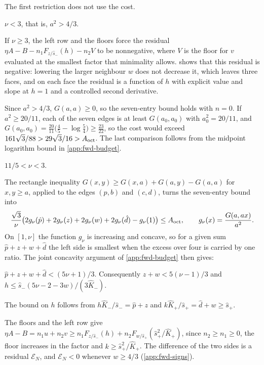  The first restriction does not use the cost.

\begin{lemma}\label{lem:fwd-small}
$\nu<3$, that is, $a^2>4/3$.
\end{lemma}

If $\nu\ge3$, the left row and the floors force the residual
$\eta A-B-n_1F_{z/\hat s_-}(h)-n_2V$ to be nonnegative, where $V$ is the floor for $v$ evaluated at
the smallest factor that minimality allows.  shows that this residual is
negative: lowering the larger neighbour $w$ does not decrease it, which leaves three faces, and on
each face the residual is a function of $h$ with explicit value and slope at $h=1$ and a controlled
second derivative.

 Since $a^2>4/3$, $G(a,a)\ge0$, so the
seven-entry bound holds with $n=0$. If $a^2\ge20/11$, each of the seven edges is at least
$G(a_0,a_0)$ with $a_0^2=20/11$, and $G(a_0,a_0)=\frac{20}{11}\bigl(\frac45-\log\frac54\bigr)\ge
\frac{23}{22}$, so the cost would exceed $161\sqrt3/88>29\sqrt3/16>A_{\mathrm{oct}}$.
The last comparison follows from the midpoint logarithm bound in \cref{app:fwd-budget}.

\begin{lemma}\label{lem:fwd-threshold}
$11/5<\nu<3$.
\end{lemma}

 The rectangle inequality
$G(x,y)\ge G(x,a)+G(a,y)-G(a,a)$ for $x,y\ge a$, applied to the edges $(p,b)$ and $(c,d)$, turns
the seven-entry bound into
\[
\frac{\sqrt3}{\nu}\bigl(2g_\nu(\hat p)+2g_\nu(z)+2g_\nu(w)+2g_\nu(\hat d)-g_\nu(1)\bigr)\le A_{\mathrm{oct}},
\qquad g_\nu(x)=\frac{G(a,ax)}{a^2}.
\]
On $[1,\nu]$ the function $g_\nu$ is increasing and concave, so for a given sum
$\hat p+z+w+\hat d$ the left side is smallest when the excess over four is carried by one ratio. The
joint concavity argument of \cref{app:fwd-budget} then gives:

\begin{lemma}\label{lem:fwd-budget}
$\hat p+z+w+\hat d<(5\nu+1)/3$. Consequently $z+w<5(\nu-1)/3$ and
$h\le\hat s_-(5\nu-2-3w)/(3\hat K_-)$.
\end{lemma}

The bound on $h$ follows from $h\hat K_-/\hat s_-=\hat p+z$ and $k\hat K_+/\hat s_+=\hat d+w\ge
\hat s_+$.

 The floors and the left row give
$\eta A-B=n_1u+n_2v\ge n_1F_{z/\hat s_-}(h)+n_2F_{w/\hat s_+}(\hat s_+^2/\hat K_+)$, since
$n_2\ge n_1\ge0$, the floor increases in the factor and $k\ge\hat s_+^2/\hat K_+$. The difference of
the two sides is a residual $\mathcal E_N$, and $\mathcal E_N<0$ whenever $w\ge4/3$
(\cref{app:fwd-signs}).

